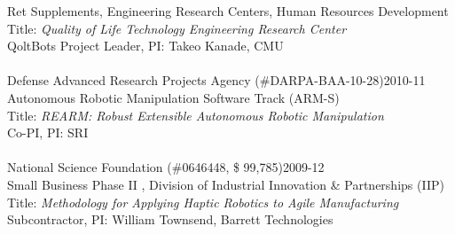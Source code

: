 Ret Supplements, Engineering Research Centers, Human Resources Development\\
Title: \textit{Quality of Life Technology Engineering Research Center}\\
QoltBots Project Leader, PI: Takeo Kanade, CMU\\
\\
Defense Advanced Research Projects Agency (\#DARPA-BAA-10-28)\hfill 2010-11\\
Autonomous Robotic Manipulation Software Track (ARM-S)\\
Title: \textit{REARM: Robust Extensible Autonomous Robotic Manipulation}\\
Co-PI, PI: SRI\\
\\
National Science Foundation (\#0646448, \$ 99,785)\hfill 2009-12\\
Small Business Phase II , Division of Industrial Innovation \& Partnerships (IIP)\\
Title: \textit{Methodology for Applying Haptic Robotics to Agile Manufacturing}\\
Subcontractor, PI: William Townsend, Barrett Technologies\\

